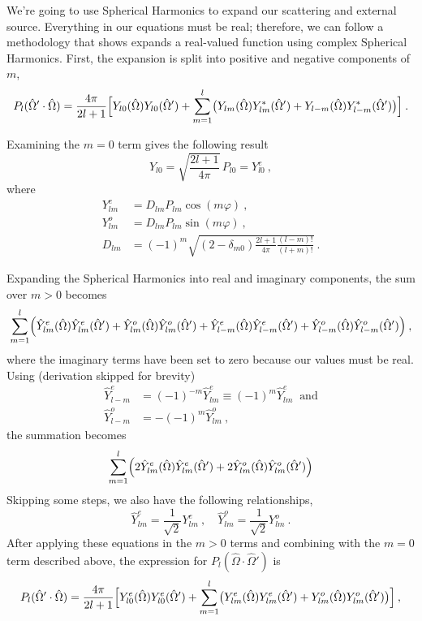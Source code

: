 \documentclass[12pt]{article}
\newcommand{\vOmega}{\ensuremath{\hat{\Omega}}}
\begin{document}
We're going to use Spherical Harmonics to expand our scattering and external source. Everything in our equations must be real; therefore, we can follow a methodology that shows expands a real-valued function using complex Spherical Harmonics.  First,
the expansion is split into positive and negative components of $m$,
\begin{equation}
  P_l(\vOmega'\cdot\vOmega) = \frac{4\pi}{2l+1}
  \Bigl[
  Y_{l0}(\vOmega)Y_{l0}(\vOmega') +
  \sum_{m=1}^l
  \bigl(Y_{lm}(\vOmega)Y^{\ast}_{lm}(\vOmega') +
  Y_{l-m}(\vOmega)Y^{\ast}_{l-m}(\vOmega')\bigr)\Bigr]\:.
\end{equation}

Examining the $m=0$ term gives the following result
\begin{equation}
  Y_{l0} = \sqrt{\frac{2l+1}{4\pi}}\,P_{l0} = Y^e_{l0}\:,
\end{equation}
where
\begin{align}
  Y^e_{lm} &= D_{lm}P_{lm}\cos (m\varphi)\:,\label{eq:Ye}\\
  Y^o_{lm} &= D_{lm}P_{lm}\sin (m\varphi)\:,\label{eq:Yo}\\
  D_{lm} &= (-1)^m\sqrt{(2-\delta_{m0})\frac{2l+1}{4\pi}
    \frac{(l-m)!}{(l+m)!}}\:.
\end{align}

Expanding the Spherical Harmonics into real and imaginary components, the sum over $m>0$ becomes
\begin{equation}
  \sum_{m=1}^l\Bigl(
  \hat{Y}^e_{lm}(\vOmega)\hat{Y}^e_{lm}(\vOmega') +
  \hat{Y}^o_{lm}(\vOmega)\hat{Y}^o_{lm}(\vOmega') +
  \hat{Y}^e_{l-m}(\vOmega)\hat{Y}^e_{l-m}(\vOmega') +
  \hat{Y}^o_{l-m}(\vOmega)\hat{Y}^o_{l-m}(\vOmega')\Bigr)\:,
\end{equation}
where the imaginary terms have been set to zero because our values must be
real. Using (derivation skipped for brevity)
\begin{align}
 \hat{Y}^e_{l-m} &= (-1)^{-m}\hat{Y}^e_{lm} \equiv (-1)^m\hat{Y}^e_{lm} \:\text{ and}\\
 \hat{Y}^o_{l-m} &= -(-1)^m\hat{Y}^o_{lm}\:,
\end{align}
the summation becomes
\begin{equation}
  \sum_{m=1}^l\Bigl(
  2\hat{Y}^e_{lm}(\vOmega)\hat{Y}^e_{lm}(\vOmega') +
  2\hat{Y}^o_{lm}(\vOmega)\hat{Y}^o_{lm}(\vOmega')\Bigr)
\end{equation}
Skipping some steps, we also have the following relationships,
\begin{equation}
  \hat{Y}^e_{lm} = \frac{1}{\sqrt{2}}Y^e_{lm}\:,\quad
  \hat{Y}^o_{lm} = \frac{1}{\sqrt{2}}Y^o_{lm}\:.
\end{equation}
After applying these equations in the $m>0$ terms and combining with the $m=0$
term described above, the expression for $P_l(\vOmega\cdot\vOmega')$ is
\begin{equation}
  P_l(\vOmega'\cdot\vOmega) = \frac{4\pi}{2l+1}
  \Bigl[
  Y^e_{l0}(\vOmega)Y^e_{l0}(\vOmega') +
  \sum_{m=1}^l
  \bigl(Y^e_{lm}(\vOmega)Y^e_{lm}(\vOmega') +
  Y^o_{lm}(\vOmega)Y^o_{lm}(\vOmega')\bigr)\Bigr]\:,
  \label{eq:P_l(mu_o)}
\end{equation}
\end{document}
